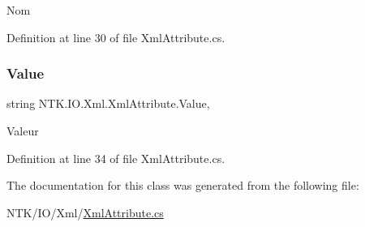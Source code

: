 Nom 



Definition at line 30 of file Xml\+Attribute.\+cs.

\mbox{\label{class_n_t_k_1_1_i_o_1_1_xml_1_1_xml_attribute_af901ded7cbb9c27d5f8f246a9263f1f6}} 
\subsubsection{\texorpdfstring{Value}{Value}}
{\footnotesize\ttfamily string N\+T\+K.\+I\+O.\+Xml.\+Xml\+Attribute.\+Value\hspace{0.3cm}{\ttfamily [get]}, {\ttfamily [set]}}



Valeur 



Definition at line 34 of file Xml\+Attribute.\+cs.



The documentation for this class was generated from the following file\+:\begin{DoxyCompactItemize}
\item 
N\+T\+K/\+I\+O/\+Xml/\mbox{\hyperlink{_xml_attribute_8cs}{Xml\+Attribute.\+cs}}\end{DoxyCompactItemize}
